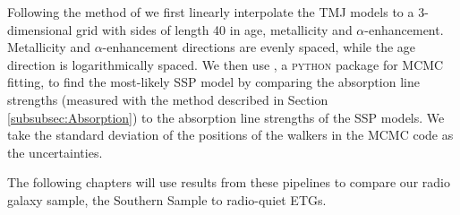 			Following the method of \citet{McDermid2006} we first linearly interpolate the TMJ models to a 3-dimensional grid with sides of length 40 in age, metallicity and $\alpha$-enhancement. Metallicity and $\alpha$-enhancement directions are evenly spaced, while the age direction is logarithmically spaced. We then use , a \textsc{python} package for MCMC fitting, to find the most-likely SSP model by comparing the absorption line strengths (measured with the method described in Section \ref{subsubsec:Absorption}) to the absorption line strengths of the SSP models. We take the standard deviation of the positions of the walkers in the MCMC code as the uncertainties.

			The following chapters will use results from these pipelines to compare our radio galaxy sample, the Southern Sample to radio-quiet ETGs.